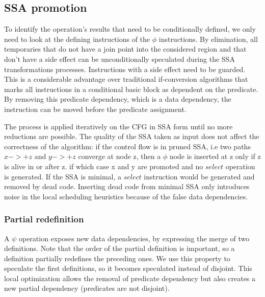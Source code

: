 \subsection{SSA promotion}

To identify the operation's results that need to be conditionally defined, we only need to look at the defining instructions of the $\phi$ instructions. By elimination, all temporaries that do not have a join point into the considered region and that don't have a side effect can be unconditionally speculated during the SSA transformations processes. Instructions with a side effect need to be guarded. This is a considerable advantage over traditional if-conversion algorithms that marks all instructions in a conditional basic block as dependent on the predicate. By removing this predicate dependency, which is a data dependency, the instruction can be moved before the predicate assignment.

The process is applied iteratively on the CFG in SSA form until no more reductions are possible. The quality of the SSA taken as input does not affect the correctness of the algorithm: if the control flow is in pruned SSA, i.e two paths $x->+z$ and $y->+z$ converge at node z, then a $\phi$ node is inserted at z only if z is alive in or after z. if which case x and y are promoted and no $select$ operation is generated. If the SSA is minimal, a $select$ instruction would be generated and removed by dead code. Inserting dead code from minimal SSA only introduces noise in the local scheduling heuristics because of the false data dependencies.

\subsubsection{Partial redefinition}

A $\psi$ operation exposes new data dependencies, by expressing the merge of two definitions. Note that the order of the partial definition is important, so a definition partially redefines the preceding ones. We use this property to speculate the first definitions, so it becomes speculated instead of disjoint. This local optimization allows the removal of predicate dependency but also creates a new partial dependency (predicates are not disjoint). 

